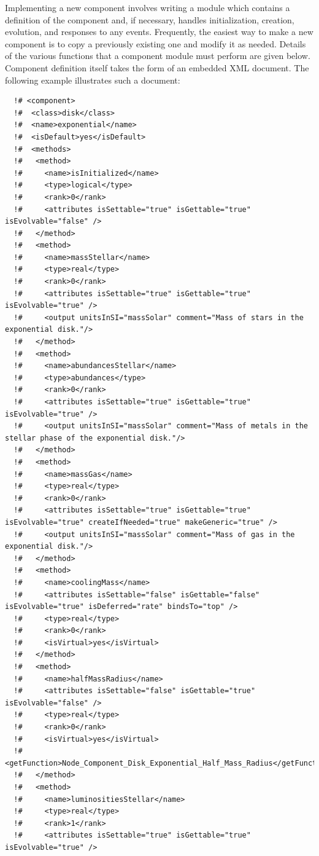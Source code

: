 Implementing a new component involves writing a module which contains a definition of the component and, if necessary, handles initialization, creation, evolution, and responses to any events. Frequently, the easiest way to make a new component is to copy a previously existing one and modify it as needed. Details of the various functions that a component module must perform are given below. Component definition itself takes the form of an embedded XML document. The following example illustrates such a document:
\begin{verbatim}
  !# <component>
  !#  <class>disk</class>
  !#  <name>exponential</name>
  !#  <isDefault>yes</isDefault>
  !#  <methods>
  !#   <method>
  !#     <name>isInitialized</name>
  !#     <type>logical</type>
  !#     <rank>0</rank>
  !#     <attributes isSettable="true" isGettable="true" isEvolvable="false" />
  !#   </method>
  !#   <method>
  !#     <name>massStellar</name>
  !#     <type>real</type>
  !#     <rank>0</rank>
  !#     <attributes isSettable="true" isGettable="true" isEvolvable="true" />
  !#     <output unitsInSI="massSolar" comment="Mass of stars in the exponential disk."/>
  !#   </method>
  !#   <method>
  !#     <name>abundancesStellar</name>
  !#     <type>abundances</type>
  !#     <rank>0</rank>
  !#     <attributes isSettable="true" isGettable="true" isEvolvable="true" />
  !#     <output unitsInSI="massSolar" comment="Mass of metals in the stellar phase of the exponential disk."/>
  !#   </method>
  !#   <method>
  !#     <name>massGas</name>
  !#     <type>real</type>
  !#     <rank>0</rank>
  !#     <attributes isSettable="true" isGettable="true" isEvolvable="true" createIfNeeded="true" makeGeneric="true" />
  !#     <output unitsInSI="massSolar" comment="Mass of gas in the exponential disk."/>
  !#   </method>
  !#   <method>
  !#     <name>coolingMass</name>
  !#     <attributes isSettable="false" isGettable="false" isEvolvable="true" isDeferred="rate" bindsTo="top" />
  !#     <type>real</type>
  !#     <rank>0</rank>
  !#     <isVirtual>yes</isVirtual>
  !#   </method>
  !#   <method>
  !#     <name>halfMassRadius</name>
  !#     <attributes isSettable="false" isGettable="true" isEvolvable="false" />
  !#     <type>real</type>
  !#     <rank>0</rank>
  !#     <isVirtual>yes</isVirtual>
  !#     <getFunction>Node_Component_Disk_Exponential_Half_Mass_Radius</getFunction>
  !#   </method>
  !#   <method>
  !#     <name>luminositiesStellar</name>
  !#     <type>real</type>
  !#     <rank>1</rank>
  !#     <attributes isSettable="true" isGettable="true" isEvolvable="true" />

\end{verbatim}
